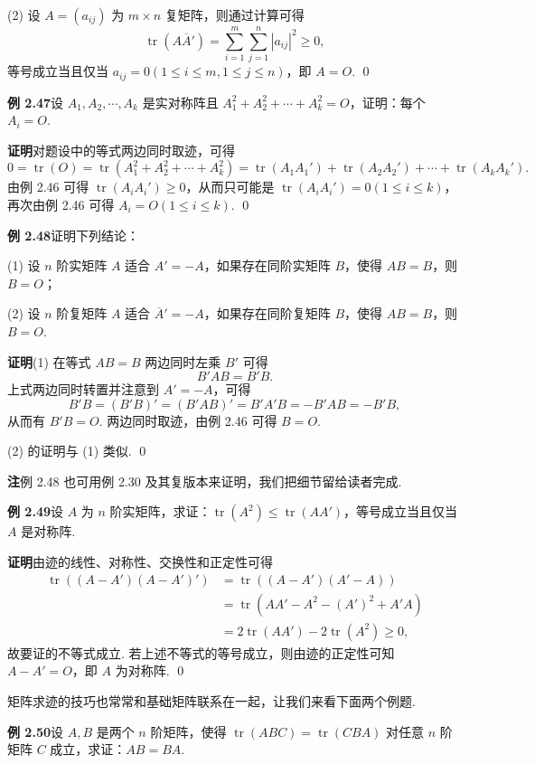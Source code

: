\documentclass[UTF8, 12pt, fontset=fandol, oneside]{ctexart}
\begin{document}
(2) 设 $A=(a_{ij})$ 为 $m\times n$ 复矩阵，则通过计算可得
\[
\operatorname{tr}(A\overline A')=\sum_{i=1}^m\sum_{j=1}^n |a_{ij}|^2\ge0,
\]
等号成立当且仅当 $a_{ij}=0(1\le i\le m,1\le j\le n)$，即 $A=O$. \qed

\noindent\textbf{例 2.47}\quad 设 $A_1,A_2,\cdots,A_k$ 是实对称阵且 $A_1^2+A_2^2+\cdots+A_k^2=O$，证明：每个 $A_i=O$.

\noindent\textbf{证明}\quad 对题设中的等式两边同时取迹，可得
\[
0=\operatorname{tr}(O)=\operatorname{tr}(A_1^2+A_2^2+\cdots+A_k^2)
=\operatorname{tr}(A_1A_1')+\operatorname{tr}(A_2A_2')+\cdots+\operatorname{tr}(A_kA_k').
\]
由例 2.46 可得 $\operatorname{tr}(A_iA_i')\ge0$，从而只可能是 $\operatorname{tr}(A_iA_i')=0(1\le i\le k)$，再次由例 2.46 可得 $A_i=O(1\le i\le k)$. \qed

\noindent\textbf{例 2.48}\quad 证明下列结论：

(1) 设 $n$ 阶实矩阵 $A$ 适合 $A'=-A$，如果存在同阶实矩阵 $B$，使得 $AB=B$，则 $B=O$；

(2) 设 $n$ 阶复矩阵 $A$ 适合 $\overline A'=-A$，如果存在同阶复矩阵 $B$，使得 $AB=B$，则 $B=O$.

\noindent\textbf{证明}\quad (1) 在等式 $AB=B$ 两边同时左乘 $B'$ 可得
\[
B'AB=B'B.
\]
上式两边同时转置并注意到 $A'=-A$，可得
\[
B'B=(B'B)'=(B'AB)'=B'A'B=-B'AB=-B'B,
\]
从而有 $B'B=O$. 两边同时取迹，由例 2.46 可得 $B=O$.

(2) 的证明与 (1) 类似. \qed

\noindent\textbf{注}\quad 例 2.48 也可用例 2.30 及其复版本来证明，我们把细节留给读者完成.

\noindent\textbf{例 2.49}\quad 设 $A$ 为 $n$ 阶实矩阵，求证：$\operatorname{tr}(A^2)\le \operatorname{tr}(AA')$，等号成立当且仅当 $A$ 是对称阵.

\noindent\textbf{证明}\quad 由迹的线性、对称性、交换性和正定性可得
\[
\begin{aligned}
\operatorname{tr}((A-A')(A-A')')
&=\operatorname{tr}((A-A')(A'-A))\\
&=\operatorname{tr}(AA'-A^2-(A')^2+A'A)\\
&=2\operatorname{tr}(AA')-2\operatorname{tr}(A^2)\ge0,
\end{aligned}
\]
故要证的不等式成立. 若上述不等式的等号成立，则由迹的正定性可知 $A-A'=O$，即 $A$ 为对称阵. \qed

矩阵求迹的技巧也常常和基础矩阵联系在一起，让我们来看下面两个例题.

\noindent\textbf{例 2.50}\quad 设 $A,B$ 是两个 $n$ 阶矩阵，使得 $\operatorname{tr}(ABC)=\operatorname{tr}(CBA)$ 对任意 $n$ 阶矩阵 $C$ 成立，求证：$AB=BA$.
\end{document}
